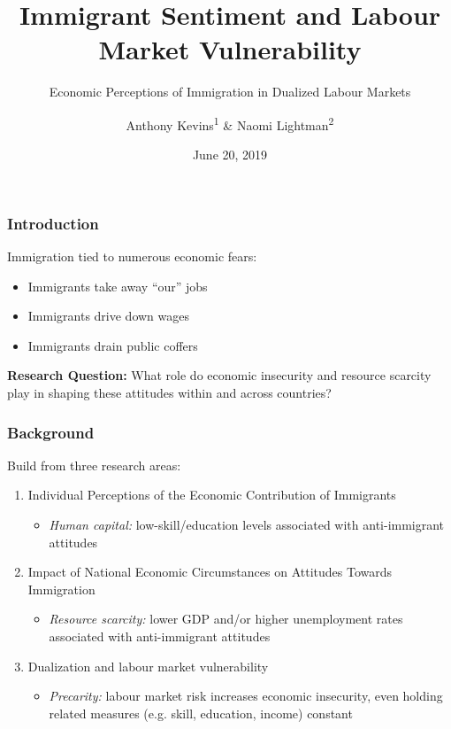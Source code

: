 \documentclass[14pt]{beamer}
\title{Immigrant Sentiment and Labour Market Vulnerability}
\subtitle{Economic Perceptions of Immigration in Dualized Labour Markets}
\author{Anthony Kevins\textsuperscript{1} \& Naomi Lightman\textsuperscript{2}}
\institute{\textsuperscript{1}School of Governance, Utrecht 		University\\
	\textsuperscript{2}Department of Sociology, University of Calgary \bigskip}
\date{June 20, 2019}
\begin{document}
\begin{frame}
\titlepage
\end{frame}

\begin{frame}
	\frametitle{Introduction}
	Immigration tied to numerous economic fears: 
	\begin{itemize}
		\pause
		\item Immigrants take away ``our'' jobs 
		\pause
		\item Immigrants drive down wages 
		\pause
		\item Immigrants drain public coffers	
	\end{itemize}
	\bigskip
	\pause 
	\textbf{Research Question:} What role do economic insecurity and resource scarcity play in shaping these attitudes within and across countries? 
\end{frame}

\begin{frame}
	\frametitle{Background}
	Build from three research areas:
	\begin{enumerate}
		\pause
		\item Individual Perceptions of the Economic Contribution of Immigrants
		\begin{itemize}
			\pause
			\item \textit{Human capital:} low-skill/education levels associated with anti-immigrant attitudes
		\end{itemize}
		\pause
		\item Impact of National Economic Circumstances on Attitudes Towards Immigration
		\begin{itemize}
			\pause
			\item \textit{Resource scarcity:} lower GDP and/or higher unemployment rates associated with anti-immigrant attitudes
		\end{itemize}
		\pause
		\item Dualization and labour market vulnerability  
		\begin{itemize}
			\pause 
			\item \textit{Precarity:} labour market risk increases economic insecurity, even holding related measures (e.g. skill, education, income) constant
		\end{itemize}
	\end{enumerate}
\end{frame}
\end{document}
